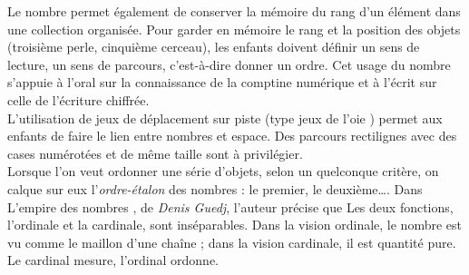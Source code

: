    Le nombre permet également de conserver la mémoire du rang d’un élément dans une collection organisée. Pour garder en mémoire le rang et la position des objets (troisième perle, cinquième cerceau), les enfants doivent définir un sens de lecture, un sens de parcours, c’est-à-dire donner un ordre. Cet usage du nombre s’appuie à l’oral sur la connaissance de la comptine numérique et à l’écrit sur celle de l’écriture chiffrée. \\
   L’utilisation de jeux de déplacement sur piste (type \og jeux de l’oie \fg) permet aux enfants de faire le lien entre nombres et espace. Des parcours rectilignes avec des cases numérotées et de même taille sont à privilégier. \\ [2mm]
   Lorsque l'on veut ordonner une série d'objets, selon un quelconque critère, on calque sur eux l'{\it ordre-étalon} des nombres : le premier, le deuxième\dots. Dans \og L'empire des nombres \fg{}, de {\it Denis Guedj}, l'auteur précise que \og Les deux fonctions, l'ordinale et la cardinale, sont inséparables. Dans la vision ordinale, le nombre est vu comme le maillon d'une chaîne ; dans la vision cardinale, il est quantité pure. Le cardinal mesure, l'ordinal ordonne. \fg \\

